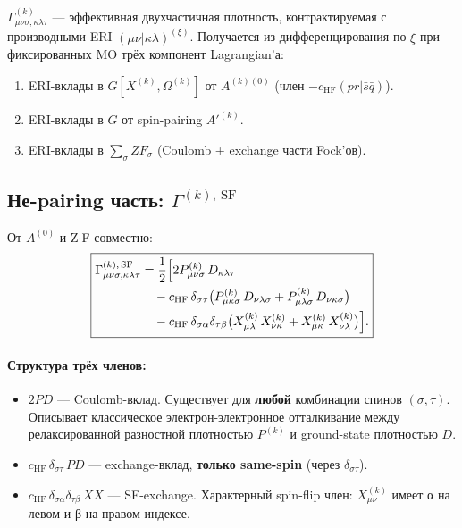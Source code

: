 \documentclass[11pt, a4paper]{article}
\theoremstyle{definition}
\newcommand{\HF}{\text{HF}}
\begin{document}
$\Gamma^{(k)}_{\mu\nu\sigma, \kappa\lambda\tau}$ --- эффективная двухчастичная плотность, контрактируемая с производными ERI $(\mu\nu | \kappa\lambda)^{(\xi)}$. Получается из дифференцирования по $\xi$ при фиксированных MO трёх компонент Lagrangian'а:

\begin{enumerate}
    \item ERI-вклады в $G[X^{(k)}, \Omega^{(k)}]$ от $A^{(k)(0)}$ (член $-c_{\HF}(pr|\bar s\bar q)$).
    \item ERI-вклады в $G$ от spin-pairing $A'^{(k)}$.
    \item ERI-вклады в $\sum_\sigma Z F_\sigma$ (Coulomb + exchange части Fock'ов).
\end{enumerate}

\subsection{Не-pairing часть: $\Gamma^{(k),\,\text{SF}}$}

От $A^{(0)}$ и Z$\cdot$F совместно:
\begin{equation}
    \boxed{
    \begin{aligned}
        \Gamma^{(k),\,\text{SF}}_{\mu\nu\sigma, \kappa\lambda\tau} &= \frac{1}{2} \Bigl[ 2 P^{(k)}_{\mu\nu\sigma}\, D_{\kappa\lambda\tau} \\
        &\quad - c_{\HF}\, \delta_{\sigma\tau} \bigl( P^{(k)}_{\mu\kappa\sigma}\, D_{\nu\lambda\sigma} + P^{(k)}_{\mu\lambda\sigma}\, D_{\nu\kappa\sigma} \bigr) \\
        &\quad - c_{\HF}\, \delta_{\sigma\alpha} \delta_{\tau\beta} \bigl( X^{(k)}_{\mu\lambda}\, X^{(k)}_{\nu\kappa} + X^{(k)}_{\mu\kappa}\, X^{(k)}_{\nu\lambda} \bigr) \Bigr].
    \end{aligned}}
    \label{eq:GammaSF}
\end{equation}

\paragraph{Структура трёх членов:}
\begin{itemize}
    \item $2 P D$ --- Coulomb-вклад. Существует для \textbf{любой} комбинации спинов $(\sigma, \tau)$. Описывает классическое электрон-электронное отталкивание между релаксированной разностной плотностью $P^{(k)}$ и ground-state плотностью $D$.
    \item $c_{\HF}\, \delta_{\sigma\tau}\, P D$ --- exchange-вклад, \textbf{только same-spin} (через $\delta_{\sigma\tau}$).
    \item $c_{\HF}\, \delta_{\sigma\alpha} \delta_{\tau\beta}\, X X$ --- SF-exchange. Характерный spin-flip член: $X^{(k)}_{\mu\nu}$ имеет α на левом и β на правом индексе.
\end{itemize}
\end{document}

